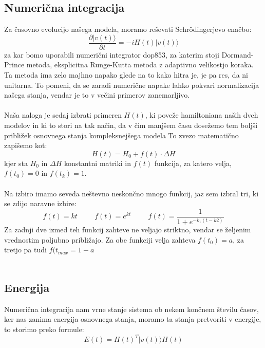 \documentclass{article}
\begin{document}
\subsection{Numerična integracija}

Za časovno evolucijo našega modela, moramo reševati Schrödingerjevo enačbo:
\begin{equation}
    \frac{\partial \vert v(t)\rangle}{\partial t} = -iH(t) \vert v(t) \rangle
\end{equation}
za kar bomo uporabili numerični integrator dop853, za katerim stoji Dormand-Prince metoda, eksplicitna Runge-Kutta metoda z adaptivno velikostjo koraka. Ta metoda ima zelo majhno napako glede na to kako hitra je, je pa res, da ni unitarna. To pomeni, da se zaradi numerične napake lahko pokvari normalizacija našega stanja, vendar je to v večini primerov zanemarljivo.\\\\
Naša naloga je sedaj izbrati primeren $H(t)$, ki poveže hamiltoniana naših dveh modelov in ki to stori na tak način, da v čim manjšem času dosežemo tem boljši približek osnovnega stanja kompleksnejšega modela To zvezo matematično zapišemo kot:
\begin{equation}
    H(t) = H_0 + f(t) \cdot \Delta H
\end{equation}
kjer sta $H_0$ in $\Delta H$ konstantni matriki in $f(t)$ funkcija, za katero velja, $f(t_0) = 0$ in $f(t_k) = 1$.\\\\
Na izbiro imamo seveda neštevno neskončno mnogo funkcij, jaz sem izbral tri, ki se zdijo naravne izbire:
\begin{equation}
    f(t) = kt \hspace{1cm} f(t) = e^{kt} \hspace{1cm} f(t) = \frac{1}{1+e^{-k_1(t-k2)}}
\end{equation}
Za zadnji dve izmed teh funkcij zahteve ne veljajo striktno, vendar se željenim vrednostim poljubno približajo. Za obe funkciji velja zahteva $f(t_0) = a$, za tretjo pa tudi $f(t_{max} = 1-a$\\\\

\subsection{Energija}
\noindent Numerična integracija nam vrne stanje sistema ob nekem končnem številu časov, ker nas zanima energija osnovnega stanja, moramo ta stanja pretvoriti v energije, to storimo preko formule:
\begin{equation}
E(t) = H(t)^T\vert v(t) \rangle H(t)    
\end{equation}
\end{document}
